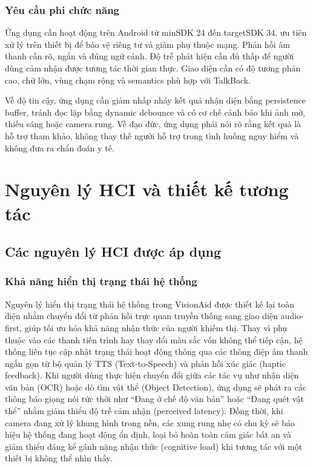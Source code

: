 \documentclass[a4paper,13pt]{report}
\begin{document}
\subsection{Yêu cầu phi chức năng}

Ứng dụng cần hoạt động trên Android từ minSDK 24 đến targetSDK 34, ưu tiên xử lý trên thiết bị để bảo vệ riêng tư và giảm phụ thuộc mạng. Phản hồi âm thanh cần rõ, ngắn và đúng ngữ cảnh. Độ trễ phát hiện cần đủ thấp để người dùng cảm nhận được tương tác thời gian thực. Giao diện cần có độ tương phản cao, chữ lớn, vùng chạm rộng và semantics phù hợp với TalkBack.

Về độ tin cậy, ứng dụng cần giảm nhấp nháy kết quả nhận diện bằng persistence buffer, tránh đọc lặp bằng dynamic debounce và có cơ chế cảnh báo khi ảnh mờ, thiếu sáng hoặc camera rung. Về đạo đức, ứng dụng phải nói rõ rằng kết quả là hỗ trợ tham khảo, không thay thế người hỗ trợ trong tình huống nguy hiểm và không đưa ra chẩn đoán y tế.

\chapter{Nguyên lý HCI và thiết kế tương tác}

\section{Các nguyên lý HCI được áp dụng}

\subsection{Khả năng hiển thị trạng thái hệ thống}

Nguyên lý hiển thị trạng thái hệ thống trong VisionAid được thiết kế lại toàn diện nhằm chuyển đổi từ phản hồi trực quan truyền thống sang giao diện audio-first, giúp tối ưu hóa khả năng nhận thức của người khiếm thị. Thay vì phụ thuộc vào các thanh tiến trình hay thay đổi màu sắc vốn không thể tiếp cận, hệ thống liên tục cập nhật trạng thái hoạt động thông qua các thông điệp âm thanh ngắn gọn từ bộ quản lý TTS (Text-to-Speech) và phản hồi xúc giác (haptic feedback). Khi người dùng thực hiện chuyển đổi giữa các tác vụ như nhận diện văn bản (OCR) hoặc dò tìm vật thể (Object Detection), ứng dụng sẽ phát ra các thông báo giọng nói tức thời như ``Đang ở chế độ văn bản'' hoặc ``Đang quét vật thể'' nhằm giảm thiểu độ trễ cảm nhận (perceived latency). Đồng thời, khi camera đang xử lý khung hình trong nền, các xung rung nhẹ có chu kỳ sẽ báo hiệu hệ thống đang hoạt động ổn định, loại bỏ hoàn toàn cảm giác bất an và giảm thiểu đáng kể gánh nặng nhận thức (cognitive load) khi tương tác với một thiết bị không thể nhìn thấy.
\end{document}

